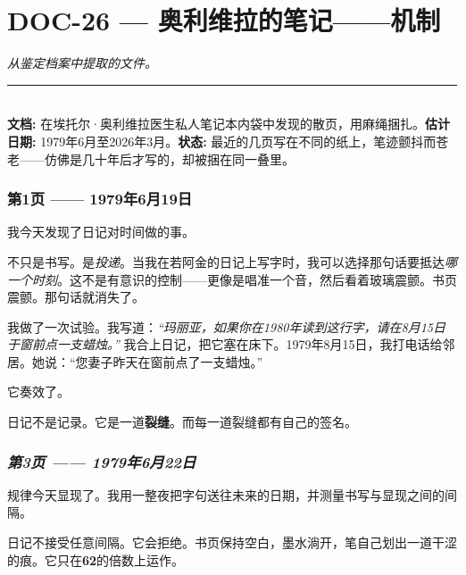 \section*{\textbf{DOC-26} --- 奥利维拉的笔记——机制}

\noindent \textit{从鉴定档案中提取的文件。}

\vspace{0.5em}\noindent\rule{\textwidth}{0.5pt}\vspace{0.5em}

\\[-0.2em]

\noindent\textbf{文档:} 在埃托尔·奥利维拉医生私人笔记本内袋中发现的散页，用麻绳捆扎。\textbf{估计日期:} 1979年6月至2026年3月。\textbf{状态:} 最近的几页写在不同的纸上，笔迹颤抖而苍老——仿佛是几十年后才写的，却被捆在同一叠里。

\subsubsection*{第1页 —— 1979年6月19日}

\noindent 我今天发现了日记对时间做的事。

\noindent 不只是书写。是\textit{投递}。当我在若阿金的日记上写字时，我可以选择那句话要抵达\textit{哪一个时刻}。这不是有意识的控制——更像是唱准一个音，然后看着玻璃震颤。书页震颤。那句话就消失了。

\noindent 我做了一次试验。我写道：\textit{\textquotedblleft{}玛丽亚，如果你在1980年读到这行字，请在8月15日于窗前点一支蜡烛。\textquotedblright{}} 我合上日记，把它塞在床下。1979年8月15日，我打电话给邻居。她说：\textquotedblleft{}您妻子昨天在窗前点了一支蜡烛。\textquotedblright{}

\noindent 它奏效了。

\noindent 日记不是记录。它是一道\textbf{裂缝}。而每一道裂缝都有自己的签名。

\subsubsection*{\textit{第3页 —— 1979年6月22日}}

\noindent 规律今天显现了。我用一整夜把字句送往未来的日期，并测量书写与显现之间的间隔。

\noindent 日记不接受任意间隔。它会拒绝。书页保持空白，墨水淌开，笔自己划出一道干涩的痕。它只在\textbf{62}的倍数上运作。

